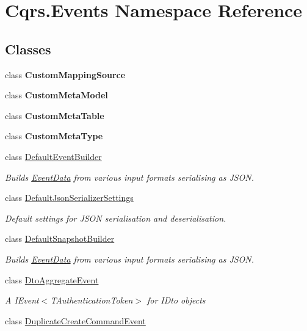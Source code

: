 \hypertarget{namespaceCqrs_1_1Events}{}\section{Cqrs.\+Events Namespace Reference}
\label{namespaceCqrs_1_1Events}
\subsection*{Classes}
\begin{DoxyCompactItemize}
\item 
class {\bfseries Custom\+Mapping\+Source}
\item 
class {\bfseries Custom\+Meta\+Model}
\item 
class {\bfseries Custom\+Meta\+Table}
\item 
class {\bfseries Custom\+Meta\+Type}
\item 
class \hyperlink{classCqrs_1_1Events_1_1DefaultEventBuilder}{Default\+Event\+Builder}
\begin{DoxyCompactList}\small\item\em Builds \hyperlink{classCqrs_1_1Events_1_1EventData}{Event\+Data} from various input formats serialising as J\+S\+ON. \end{DoxyCompactList}\item 
class \hyperlink{classCqrs_1_1Events_1_1DefaultJsonSerializerSettings}{Default\+Json\+Serializer\+Settings}
\begin{DoxyCompactList}\small\item\em Default settings for J\+S\+ON serialisation and deserialisation. \end{DoxyCompactList}\item 
class \hyperlink{classCqrs_1_1Events_1_1DefaultSnapshotBuilder}{Default\+Snapshot\+Builder}
\begin{DoxyCompactList}\small\item\em Builds \hyperlink{classCqrs_1_1Events_1_1EventData}{Event\+Data} from various input formats serialising as J\+S\+ON. \end{DoxyCompactList}\item 
class \hyperlink{classCqrs_1_1Events_1_1DtoAggregateEvent}{Dto\+Aggregate\+Event}
\begin{DoxyCompactList}\small\item\em A I\+Event$<$\+T\+Authentication\+Token$>$ for I\+Dto objects \end{DoxyCompactList}\item 
class \hyperlink{classCqrs_1_1Events_1_1DuplicateCreateCommandEvent}{Duplicate\+Create\+Command\+Event}

\end{DoxyCompactItemize}
